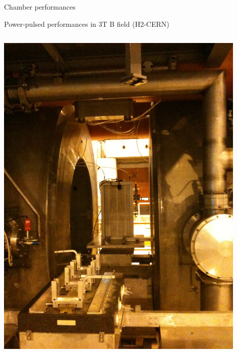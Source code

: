\documentclass[10pt]{beamer}
\begin{document}
\begin{frame}{Chamber performances  }
\begin{block}{Power-pulsed performances in 3T B field (H2-CERN)}
 \begin{columns}

      \begin{column}{0.5\textwidth}
        \centerline{\includegraphics[width=0.9\textwidth]{images/PowerPulsingPhoto}}
      \end{column}
     

\end{columns}
\end{block}
\end{frame}
\end{document}
